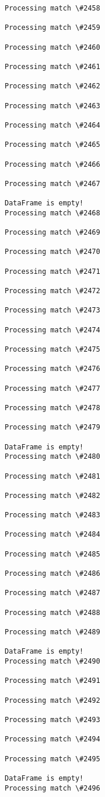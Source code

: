 \documentclass[11pt]{article}
\begin{document}
\begin{Verbatim}[commandchars=\\\{\}]
Processing match \#2458

Processing match \#2459

Processing match \#2460

Processing match \#2461

Processing match \#2462

Processing match \#2463

Processing match \#2464

Processing match \#2465

Processing match \#2466

Processing match \#2467

DataFrame is empty!
Processing match \#2468

Processing match \#2469

Processing match \#2470

Processing match \#2471

Processing match \#2472

Processing match \#2473

Processing match \#2474

Processing match \#2475

Processing match \#2476

Processing match \#2477

Processing match \#2478

Processing match \#2479

DataFrame is empty!
Processing match \#2480

Processing match \#2481

Processing match \#2482

Processing match \#2483

Processing match \#2484

Processing match \#2485

Processing match \#2486

Processing match \#2487

Processing match \#2488

Processing match \#2489

DataFrame is empty!
Processing match \#2490

Processing match \#2491

Processing match \#2492

Processing match \#2493

Processing match \#2494

Processing match \#2495

DataFrame is empty!
Processing match \#2496


\end{Verbatim}
\end{document}
